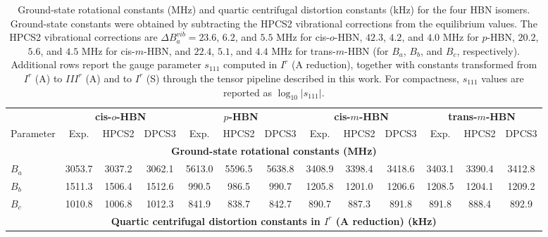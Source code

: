 \begin{table}[ht]
  \centering
  \scriptsize
  \setlength{\tabcolsep}{5pt}

  \caption{Ground-state rotational constants (MHz) and quartic
  centrifugal distortion constants (kHz) for the four HBN isomers.
  Ground-state constants were obtained by subtracting the HPCS2
  vibrational corrections from the equilibrium values.
  The HPCS2 vibrational corrections are
  $\Delta B_a^{vib}=23.6$, $6.2$, and $5.5$ MHz for
  cis-$o$-HBN,
  $42.3$, $4.2$, and $4.0$ MHz for $p$-HBN,
  $20.2$, $5.6$, and $4.5$ MHz for cis-$m$-HBN,
  and $22.4$, $5.1$, and $4.4$ MHz for trans-$m$-HBN
  (for $B_a$, $B_b$, and $B_c$, respectively).
  Additional rows report the gauge parameter $s_{111}$ computed in
  $I^r$ (A reduction), together with constants transformed from
  $I^r$ (A) to $III^r$ (A) and to $I^r$ (S) through the tensor
  pipeline described in this work. For compactness,
  $s_{111}$ values are reported as $\log_{10}|s_{111}|$.}

  \begin{tabular}{lcccccccccccc}
  \toprule

  & \multicolumn{3}{c}{\textbf{cis-$o$-HBN}}
  & \multicolumn{3}{c}{\textbf{$p$-HBN}}
  & \multicolumn{3}{c}{\textbf{cis-$m$-HBN}}
  & \multicolumn{3}{c}{\textbf{trans-$m$-HBN}} \\

  Parameter
  & Exp. & HPCS2 & DPCS3
  & Exp. & HPCS2 & DPCS3
  & Exp. & HPCS2 & DPCS3
  & Exp. & HPCS2 & DPCS3 \\

  \midrule
  \multicolumn{13}{c}{\textbf{Ground-state rotational constants (MHz)}} \\

  $B_a$ &
  3053.7 & 3037.2 & 3062.1 &
  5613.0 & 5596.5 & 5638.8 &
  3408.9 & 3398.4 & 3418.6 &
  3403.1 & 3390.4 & 3412.8 \\

  $B_b$ &
  1511.3 & 1506.4 & 1512.6 &
  990.5 & 986.5 & 990.7 &
  1205.8 & 1201.0 & 1206.6 &
  1208.5 & 1204.1 & 1209.2 \\

  $B_c$ &
  1010.8 & 1006.8 & 1012.3 &
  841.9 & 838.7 & 842.7 &
  890.7 & 887.3 & 891.8 &
  891.8 & 888.4 & 892.9 \\

  \midrule
  \multicolumn{13}{c}{\textbf{Quartic centrifugal distortion constants in $I^r$ (A reduction) (kHz)}} \\


\end{tabular}
\end{table}
